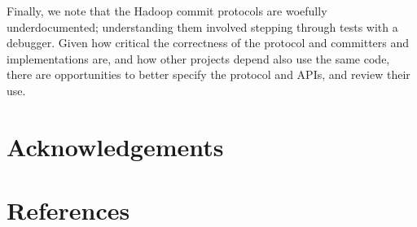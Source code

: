 \documentclass[conference]{IEEEtran}
\begin{document}
Finally, we note that the Hadoop commit protocols are woefully underdocumented;
understanding them involved stepping through tests with a debugger.
Given how critical the correctness of the protocol and committers and implementations
are, and how other projects depend also use the same code, there
are opportunities to better specify the protocol and APIs, and review
their use.


\section*{Acknowledgements}
\label{sec:acknowledgements}


\section{References}
\label{sec:references}




\end{document}
